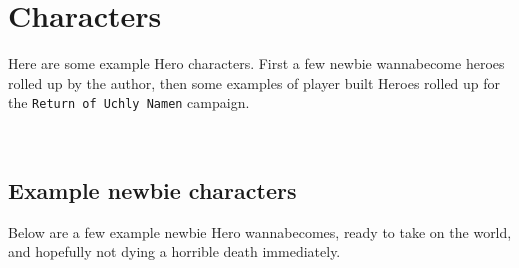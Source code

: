 

\cleardoublepage

\chapter*{Characters}

\raggedbottom

Here are some example Hero characters. First a few newbie wannabecome heroes rolled up by the author, then some examples of player built Heroes rolled up for the \texttt{Return of Uchly Namen} campaign.


\

\goodbreak
{} {}
\section*{Example newbie characters}

Below are a few example newbie Hero wannabecomes, ready to take on the world, and hopefully not dying a horrible death immediately.

%
%




